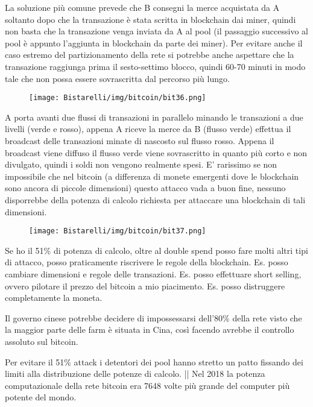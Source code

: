 \singlespacing

La soluzione più comune prevede che B consegni la merce acquistata da A soltanto dopo che la transazione è
stata scritta in blockchain dai miner, quindi non basta che la transazione venga inviata da A al pool (il passaggio
successivo al pool è appunto l’aggiunta in blockchain da parte dei miner). Per evitare anche il caso estremo del
partizionamento della rete si potrebbe anche aspettare che la transazione raggiunga prima il sesto-settimo blocco,
quindi 60-70 minuti in modo tale che non possa essere sovrascritta dal percorso più lungo.

\begin{figure}[H]
	\centering
    \texttt{[image: Bistarelli/img/bitcoin/bit36.png]}
\end{figure}

A porta avanti due flussi di transazioni in parallelo minando le transazioni a due livelli (verde e rosso), appena A
riceve la merce da B (flusso verde) effettua il broadcast delle transazioni minate di nascosto sul flusso rosso.
Appena il broadcast viene diffuso il flusso verde viene sovrascritto in quanto più corto e non divulgato, quindi i
soldi non vengono realmente spesi. E’ rarissimo se non impossibile che nel bitcoin (a differenza di monete
emergenti dove le blockchain sono ancora di piccole dimensioni) questo attacco vada a buon fine, nessuno
disporrebbe della potenza di calcolo richiesta per attaccare una blockchain di tali dimensioni.

\begin{figure}[H]
	\centering
    \texttt{[image: Bistarelli/img/bitcoin/bit37.png]}
\end{figure}

Se ho il 51\% di potenza di calcolo, oltre al double spend posso fare molti altri tipi di attacco, posso praticamente
riscrivere le regole della blockchain. Es. posso cambiare dimensioni e regole delle transazioni. Es. posso effettuare
short selling, ovvero pilotare il prezzo del bitcoin a mio piacimento. Es. posso distruggere completamente la
moneta.

\singlespacing

Il governo cinese potrebbe decidere di impossessarsi dell’80\% della rete visto che la maggior parte delle farm è
situata in Cina, così facendo avrebbe il controllo assoluto sul bitcoin.

\singlespacing

Per evitare il 51\% attack i detentori dei pool hanno stretto un patto fissando dei limiti alla distribuzione delle
potenze di calcolo. || Nel 2018 la potenza computazionale della rete bitcoin era 7648 volte più grande del
computer più potente del mondo.

